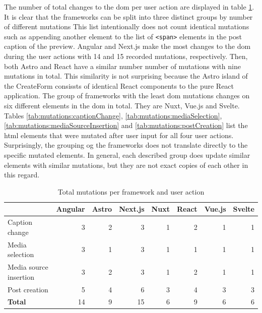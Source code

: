 \documentclass[a4paper, 12pt]{article}
\begin{document}
The number of total changes to the \acrshort{dom} per user action are displayed in table \ref{tab:mutations:total}.
It is clear that the frameworks can be split into three distinct groups by number of different mutations
This list intentionally does not count identical mutations such as appending another element to the list of \verb|<span>| elements in the post caption of the preview.
Angular and Next.js make the most changes to the \acrshort{dom} during the user actions with 14 and 15 recorded mutations, respectively.
Then, both Astro and React have a similar number number of mutations with nine mutations in total.
This similarity is not surprising because the Astro island of the CreateForm consissts of identical React components to the pure React application.
The group of frameworks with the least \acrshort{dom} mutations changes on six different elements in the \acrshort{dom} in total.
They are Nuxt, Vue.js and Svelte.
Tables \ref{tab:mutations:captionChange}, \ref{tab:mutations:mediaSelection}, \ref{tab:mutations:mediaSourceInsertion} and \ref{tab:mutations:postCreation} list the \acrshort{html} elements that were mutated after user input for all four user actions.
Surprisingly, the grouping og the frameworks does not translate directly to the specific mutated elements.
In general, each described group does update similar elements with similar mutations, but they are not exact copies of each other in this regard.

\begin{table}[!ht]
  \centering
  \begin{adjustbox}{angle=90}
    \begin{tabular}{|l|r|r|r|r|r|r|r|}
      \hline
      ~                       & \textbf{Angular}  & \textbf{Astro}  & \textbf{Next.js}  & \textbf{Nuxt} & \textbf{React}  & \textbf{Vue.js} & \textbf{Svelte} \\ \hline
      Caption change          & 3                 & 2               & 3                 & 1             & 2               & 1               & 1               \\ \hline
      Media selection         & 3                 & 1               & 3                 & 1             & 1               & 1               & 1               \\ \hline
      Media source insertion  & 3                 & 2               & 3                 & 1             & 2               & 1               & 1               \\ \hline
      Post creation           & 5                 & 4               & 6                 & 3             & 4               & 3               & 3               \\ \hline\hline
      \textbf{Total}          & 14                & 9               & 15                & 6             & 9               & 6               & 6               \\ \hline
    \end{tabular}
  \end{adjustbox}
  \caption{Total mutations per framework and user action}
  \label{tab:mutations:total}
\end{table}
\end{document}
